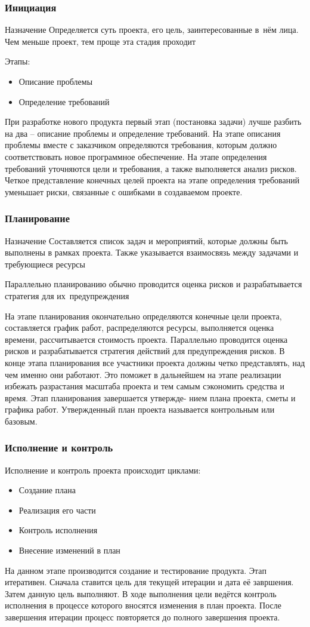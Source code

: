 \documentclass{../industrial-development}
\begin{document}
\begin{frame} \frametitle{Инициация}
	\begin{block}{Назначение}
		Определяется суть проекта, его цель, заинтересованные в~нём лица. Чем меньше проект, тем проще эта стадия проходит
	\end{block}
	Этапы:
	\begin{itemize}
		\item Описание проблемы
		\item Определение требований
	\end{itemize}
\end{frame}
\lecturenotes
При разработке нового продукта первый этап (постановка задачи) лучше разбить на два – описание проблемы и определение требований. На этапе описания проблемы вместе с заказчиком определяются требования, которым должно соответствовать новое программное обеспечение. На этапе определения требований уточняются цели и требования, а также выполняется анализ рисков. Четкое представление конечных целей проекта на этапе определения требований уменьшает риски, связанные с ошибками в создаваемом проекте.

\begin{frame} \frametitle{Планирование}
	\begin{block}{Назначение}
		 Составляется список задач и мероприятий, которые должны быть выполнены в рамках проекта. Также указывается взаимосвязь между задачами и требующиеся ресурсы
	\end{block}
	Параллельно планированию обычно проводится оценка рисков и разрабатывается стратегия для их~предупреждения
\end{frame}
\lecturenotes
На этапе планирования окончательно определяются конечные цели проекта, составляется график работ, распределяются ресурсы, выполняется оценка времени, рассчитывается стоимость проекта. Параллельно проводится оценка рисков и разрабатывается стратегия действий для предупреждения рисков. В конце этапа планирования все участники проекта должны четко представлять, над чем именно они работают. Это поможет в дальнейшем на этапе реализации избежать разрастания масштаба проекта и тем самым сэкономить средства и время. Этап планирования завершается утвержде-
нием плана проекта, сметы и графика работ. Утвержденный план проекта называется контрольным или базовым.

\begin{frame} \frametitle{Исполнение и контроль}
	Исполнение и контроль проекта происходит циклами:
	\begin{itemize}
		\item Создание плана
		\item Реализация его части
		\item Контроль исполнения
		\item Внесение изменений в план
	\end{itemize}
\end{frame}
\lecturenotes
На данном этапе производится создание и тестирование продукта. Этап итеративен. Сначала ставится цель для текущей итерации и дата её завршения. Затем данную цель выполняют. В ходе выполнения цели ведётся контроль исполнения в процессе которого вносятся изменения в план проекта. После завершения итерации процесс повторяется до полного завершения проекта.
\end{document}
